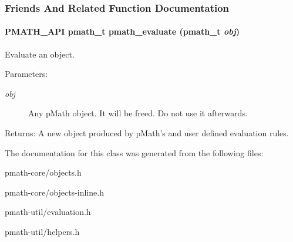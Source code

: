\subsubsection{Friends And Related Function Documentation}
\hypertarget{classpmath__t_d95c86ef0de178de4d3560518c8a8157}{
\paragraph[{pmath\_\-evaluate}]{\setlength{\rightskip}{0pt plus 5cm}PMATH\_\-API {\bf pmath\_\-t} pmath\_\-evaluate ({\bf pmath\_\-t} {\em obj})}\hfill}
\label{classpmath__t_d95c86ef0de178de4d3560518c8a8157}


Evaluate an object. 

\begin{Desc}
\item[Parameters:]
\begin{description}
\item[{\em obj}]Any pMath object. It will be freed. Do not use it afterwards. \end{description}
\end{Desc}
\begin{Desc}
\item[Returns:]A new object produced by pMath's and user defined evaluation rules. \end{Desc}


The documentation for this class was generated from the following files:\begin{CompactItemize}
\item 
pmath-core/objects.h\item 
pmath-core/objects-inline.h\item 
pmath-util/evaluation.h\item 
pmath-util/helpers.h\end{CompactItemize}
